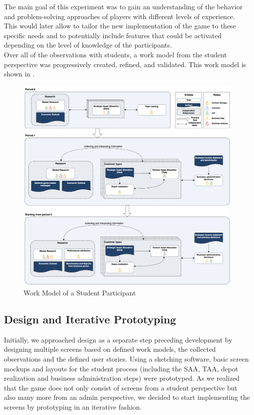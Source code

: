 The main goal of this experiment was to gain an understanding of the behavior and problem-solving approaches of players with different levels of experience. This would later allow to tailor the new implementation of the game to these specific needs and to potentially include features that could be activated depending on the level of knowledge of the participants. \\

Over all of the observations with students, a work model from the student perspective was progressively created, refined, and validated. This work model is shown in .

\begin{figure}[h!]
  \centering
  \includegraphics[scale=0.25]{img/work_model_pfm_game.png}
  \caption{Work Model of a Student Participant}
  \label{fig:work_model_student}
\end{figure}


\subsection{Design and Iterative Prototyping}
Initially, we approached design as a separate step preceding development by designing multiple screens based on defined work models, the collected observations and the defined user stories. Using a sketching software, basic screen mockups and layouts for the student process (including the SAA, TAA, depot realization and business administration steps) were prototyped. As we realized that the game does not only consist of screens from a student perspective but also many more from an admin perspective, we decided to start implementing the screens by prototyping in an iterative fashion. \\

